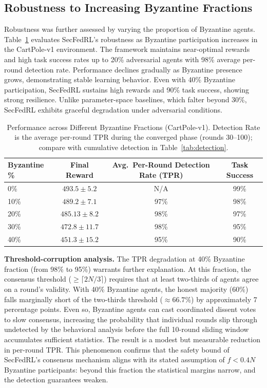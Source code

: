 \documentclass[12pt,a4paper]{article}
\begin{document}
\subsection{Robustness to Increasing Byzantine Fractions}
\label{sec:byzantine_frac}

Robustness was further assessed by varying the proportion of Byzantine agents.
Table~\ref{tab:byzantine_frac} evaluates SecFedRL's robustness as Byzantine
participation increases in the CartPole-v1 environment. The framework maintains
near-optimal rewards and high task success rates up to 20\% adversarial agents with
98\% average per-round detection rate. Performance declines gradually as Byzantine presence grows,
demonstrating stable learning behavior. Even with 40\% Byzantine participation,
SecFedRL sustains high rewards and 90\% task success, showing strong resilience.
Unlike parameter-space baselines, which falter beyond 30\%, SecFedRL exhibits graceful
degradation under adversarial conditions.

\begin{table}[htbp]
\centering
\caption{Performance across Different Byzantine Fractions (CartPole-v1). Detection Rate is the average per-round TPR during the converged phase (rounds 30--100); compare with cumulative detection in Table~\ref{tab:detection}.}
\label{tab:byzantine_frac}
\begin{tabular}{lccc}
\toprule
\textbf{Byzantine \%} & \textbf{Final Reward} & \textbf{Avg.\ Per-Round Detection Rate (TPR)} &
\textbf{Task Success} \\
\midrule
0\%  & $493.5 \pm 5.2$    & N/A & 99\% \\
10\% & $489.2 \pm 7.1$    & 97\% & 98\% \\
20\% & $485.13 \pm 8.2$   & 98\% & 97\% \\
30\% & $472.8 \pm 11.7$   & 98\% & 95\% \\
40\% & $451.3 \pm 15.2$   & 95\% & 90\% \\
\bottomrule
\end{tabular}
\end{table}

\noindent\textbf{Threshold-corruption analysis.}
The TPR degradation at 40\% Byzantine fraction (from 98\% to 95\%) warrants further
explanation. At this fraction, the consensus threshold ($\geq \lceil 2N/3 \rceil$) requires that at
least two-thirds of agents agree on a round's validity. With 40\% Byzantine agents, the
honest majority ($60\%$) falls marginally short of the two-thirds threshold ($\approx 66.7\%$) by approximately 7 percentage points. Even so, Byzantine agents can cast coordinated dissent
votes to slow consensus, increasing the probability that individual rounds slip through
undetected by the behavioral analysis before the full 10-round sliding window
accumulates sufficient statistics. The result is a modest but measurable reduction in
per-round TPR. This phenomenon confirms that the safety bound of SecFedRL's consensus
mechanism aligns with its stated assumption of $f < 0.4N$ Byzantine participants: beyond
this fraction the statistical margins narrow, and the detection guarantees weaken.
\end{document}

